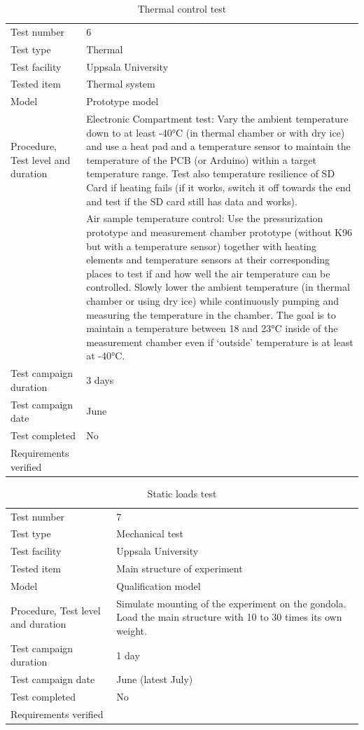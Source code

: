 \begin{table}[H]
\centering
\caption{Thermal control test}
\label{tab:test_thermal}
\begin{tabular}{L{5cm}L{10cm}}
\toprule
Test number & 6 \\
Test type & Thermal \\
Test facility & Uppsala University \\
Tested item & Thermal system \\
Model & Prototype model \\
Procedure, Test level and duration & Electronic Compartment test: Vary the ambient temperature down to at least -40°C (in thermal chamber or with dry ice) and use a heat pad and a temperature sensor to maintain the temperature of the PCB (or Arduino) within a target temperature range. Test also temperature resilience of SD Card if heating fails (if it works, switch it off towards the end and test if the SD card still has data and works). \\
& Air sample temperature control: Use the pressurization prototype and measurement chamber prototype (without K96 but with a temperature sensor) together with heating elements and temperature sensors at their corresponding places to test if and how well the air temperature can be controlled. Slowly lower the ambient temperature (in thermal chamber or using dry ice) while continuously pumping and measuring the temperature in the chamber. The goal is to maintain a temperature between 18 and 23°C inside of the measurement chamber even if ‘outside’ temperature is at least at -40°C.  \\
Test campaign duration & 3 days \\
Test campaign date & June \\
Test completed & No \\
Requirements verified & \\
\bottomrule
\end{tabular}
\end{table}




\begin{table}[H]
\centering
\caption{Static loads test}
\label{tab:test_static_loads}
\begin{tabular}{L{5cm}L{10cm}}
\toprule
Test number & 7 \\
Test type & Mechanical test \\
Test facility & Uppsala University \\
Tested item & Main structure of experiment \\
Model & Qualification model \\
Procedure, Test level and duration & Simulate mounting of the experiment on the gondola. Load the main structure with 10 to 30 times its own weight. \\
Test campaign duration & 1 day \\
Test campaign date & June (latest July) \\
Test completed & No \\
Requirements verified & \\
\bottomrule
\end{tabular}
\end{table}



